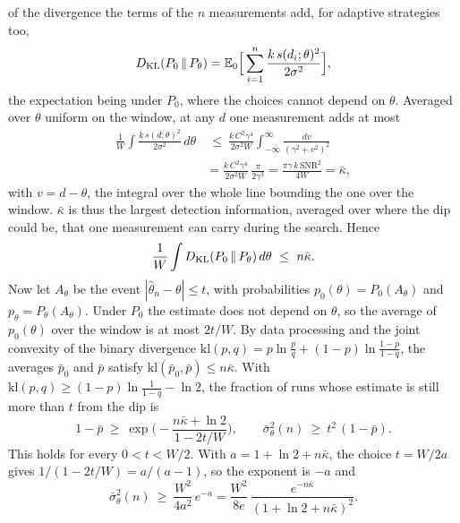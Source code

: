 of the divergence the terms of the $n$ measurements add, for adaptive strategies too,
\begin{equation*}
  D_{\rm KL}(P_0\,\|\,P_\theta)=\mathbb E_0\Big[\sum_{i=1}^{n}\frac{k\,s(d_i;\theta)^2}{2\sigma^2}\Big],
\end{equation*}
the expectation being under $P_0$, where the choices cannot depend on $\theta$. Averaged over
$\theta$ uniform on the window, at any $d$ one measurement adds at most
\begin{equation*}
  \begin{aligned}
  \frac1W\int\frac{k\,s(d;\theta)^2}{2\sigma^2}\,d\theta
  &\ \le\ \frac{k\,C^2\gamma^4}{2\sigma^2W}\int_{-\infty}^{\infty}\frac{dv}{(\gamma^2+v^2)^2}\\
  &=\frac{k\,C^2\gamma^4}{2\sigma^2W}\,\frac{\pi}{2\gamma^3}=\frac{\pi\gamma\,k\,\mathrm{SNR}^2}{4W}=\bar\kappa,
  \end{aligned}
\end{equation*}
with $v=d-\theta$, the integral over the whole line bounding the one over the window. $\bar\kappa$ is thus the
largest detection information, averaged over where the dip could be, that one measurement can carry during the search. Hence
\begin{equation*}
  \frac1W\int D_{\rm KL}(P_0\,\|\,P_\theta)\,d\theta\ \le\ n\bar\kappa .
\end{equation*}
Now let $A_\theta$ be the event $|\hat\theta_n-\theta|\le t$, with probabilities $p_0(\theta)=P_0(A_\theta)$ and
$p_\theta=P_\theta(A_\theta)$. Under $P_0$ the estimate does not depend on $\theta$, so the average of $p_0(\theta)$
over the window is at most $2t/W$. By data processing and the joint convexity of the binary divergence
$\mathrm{kl}(p,q)=p\ln\frac pq+(1-p)\ln\frac{1-p}{1-q}$, the averages $\bar p_0$ and $\bar p$ satisfy
$\mathrm{kl}(\bar p_0,\bar p)\le n\bar\kappa$. With $\mathrm{kl}(p,q)\ge(1-p)\ln\frac{1}{1-q}-\ln2$, the fraction
of runs whose estimate is still more than $t$ from the dip is
\begin{equation*}
  1-\bar p\ \ge\ \exp\!\Big(-\frac{n\bar\kappa+\ln2}{1-2t/W}\Big),
  \qquad \bar\sigma_\theta^2(n)\ \ge\ t^2\,(1-\bar p).
\end{equation*}
This holds for every $0<t<W/2$. With $a=1+\ln2+n\bar\kappa$, the choice $t=W/2a$ gives
$1/(1-2t/W)=a/(a-1)$, so the exponent is $-a$ and
\begin{equation}
  \bar\sigma_\theta^2(n)\ \ge\ \frac{W^2}{4a^2}\,e^{-a}=\frac{W^2}{8e}\,\frac{e^{-n\bar\kappa}}{(1+\ln2+n\bar\kappa)^2}.
  \label{eq:search-bound}
\end{equation}
